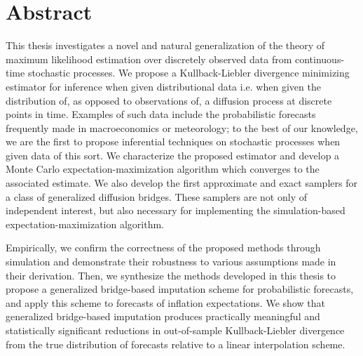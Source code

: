 
\chapter*{Abstract}

This thesis investigates a novel and natural generalization of the
theory of maximum likelihood estimation over discretely observed data
from continuous-time stochastic processes. We propose a Kullback-Liebler
divergence minimizing estimator for inference when given distributional
data i.e. when given the distribution of, as opposed to observations
of, a diffusion process at discrete points in time. Examples of such
data include the probabilistic forecasts frequently made in macroeconomics
or meteorology; to the best of our knowledge, we are the first to
propose inferential techniques on stochastic processes when given
data of this sort. We characterize the proposed estimator and develop
a Monte Carlo expectation-maximization algorithm which converges to
the associated estimate. We also develop the first approximate and
exact samplers for a class of generalized diffusion bridges. These
samplers are not only of independent interest, but also necessary
for implementing the simulation-based expectation-maximization algorithm.

Empirically, we confirm the correctness of the proposed methods through
simulation and demonstrate their robustness to various assumptions
made in their derivation. Then, we synthesize the methods developed
in this thesis to propose a generalized bridge-based imputation scheme
for probabilistic forecasts, and apply this scheme to forecasts of
inflation expectations. We show that generalized bridge-based imputation
produces practically meaningful and statistically significant reductions
in out-of-sample Kullback-Liebler divergence from the true distribution
of forecasts relative to a linear interpolation scheme.
